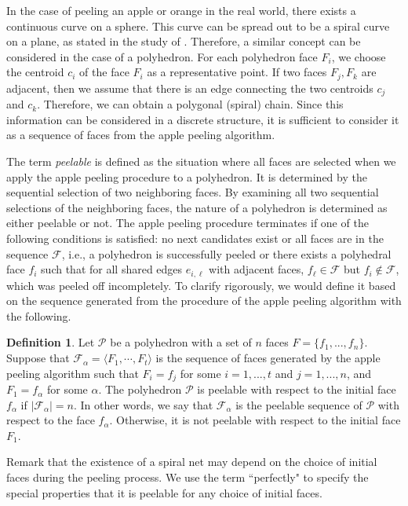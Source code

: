 \documentclass[]{interact}
\theoremstyle{plain}%
\theoremstyle{definition}
\newtheorem{definition}[theorem]{Definition}
\theoremstyle{remark}
\begin{document}
In the case of peeling an apple or orange in the real world, there exists a continuous curve on a sphere. This curve can be spread out to be a spiral curve on a plane, as stated in the study of \cite{Bartholdi2012}. Therefore, a similar concept can be considered in the case of a polyhedron. For each polyhedron face $F_i$, we choose the centroid $c_i$ of the face $F_i$ as a representative point. If two faces $F_j, F_k$ are adjacent, then we assume that there is an edge connecting the two centroids $c_j$ and $c_k$. Therefore, we can obtain a polygonal (spiral) chain. Since this information can be considered in a discrete structure, it is sufficient to consider it as a sequence of faces from the apple peeling algorithm.

The term \emph{peelable} is defined as the situation where all faces are selected when we apply the apple peeling procedure to a polyhedron. It is determined by the sequential selection of two neighboring faces. By examining all two sequential selections of the neighboring faces, the nature of a polyhedron is determined as either peelable or not. The apple peeling procedure terminates if one of the following conditions is satisfied: no next candidates exist  or all faces are in the sequence $\mathcal{F}$, i.e., a polyhedron is successfully peeled or there exists a polyhedral face $f_i$ such that for all shared edges $e_{i,\ell}$ with adjacent faces, $f_{\ell}\in \mathcal{F}$ but $f_i\notin\mathcal{F}$, which was peeled off incompletely. To clarify rigorously, we would define it based on the sequence generated from the procedure of the apple peeling algorithm with the following.

\begin{definition}
Let $\mathcal{P}$ be a polyhedron with a set of $n$ faces $F=\{f_1, ..., f_n\}$. Suppose that $\mathcal{F}_{\alpha}=\langle F_1, \cdots , F_t\rangle$ is the sequence of faces generated by the apple peeling algorithm such that $F_i = f_j$ for some $i=1, ..., t$ and $j=1, ..., n$, and $F_1 = f_{\alpha}$ for some $\alpha$. The polyhedron $\mathcal{P}$ is peelable with respect to the initial face $f_{\alpha}$ if $|\mathcal{F}_{\alpha}|=n$. In other words, we say that $\mathcal{F}_{\alpha}$ is the peelable sequence of $\mathcal{P}$ with respect to the face $f_\alpha$. Otherwise, it is not peelable with respect to the initial face $F_1$.
\end{definition}

Remark that the existence of a spiral net may depend on the choice of initial faces during the peeling process. We use the term ``perfectly" to specify the special properties that it is peelable for any choice of initial faces.
\end{document}
